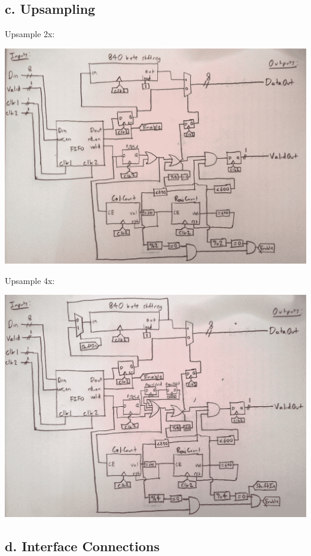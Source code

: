 \documentclass[11pt]{article}
\begin{document}
\subsection*{c. Upsampling}

Upsample 2x:

\noindent\includegraphics[width=\textwidth]{modules/procupsample2x.png}

Upsample 4x:

\noindent\includegraphics[width=\textwidth]{modules/procupsample4x.png}

\subsection*{d. Interface Connections}
\end{document}
